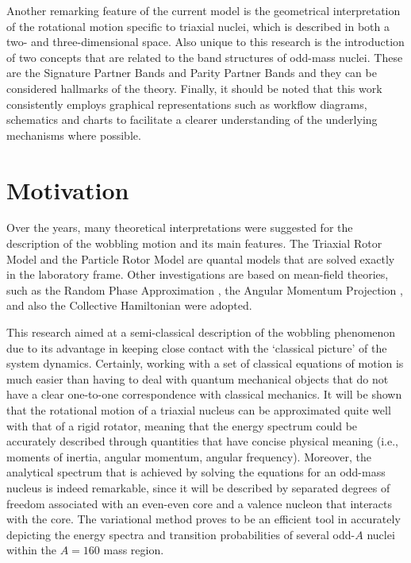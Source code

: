 Another remarking feature of the current model is the geometrical interpretation of the rotational motion specific to triaxial nuclei, which is described in both a two- and three-dimensional space. Also unique to this research is the introduction of two concepts that are related to the band structures of odd-mass nuclei. These are the Signature Partner Bands and Parity Partner Bands and they can be considered hallmarks of the theory. Finally, it should be noted that this work consistently employs graphical representations such as workflow diagrams, schematics and charts to facilitate a clearer understanding of the underlying mechanisms where possible.

\section{Motivation}

Over the years, many theoretical interpretations were suggested for the description of the wobbling motion and its main features. The Triaxial Rotor Model \cite{bohr1998nuclear,davydov1958rotational} and the Particle Rotor Model \cite{hamamoto2002wobbling} are quantal models that are solved exactly in the laboratory frame. Other investigations are based on mean-field theories, such as the Random Phase Approximation \cite{shimizu1995nuclear}, the Angular Momentum Projection \cite{oi2000wobbling}, and also the Collective Hamiltonian \cite{chen2014collective} were adopted.

This research aimed at a semi-classical description of the wobbling phenomenon due to its advantage in keeping close contact with the `classical picture' of the system dynamics. Certainly, working with a set of classical equations of motion is much easier than having to deal with quantum mechanical objects that do not have a clear one-to-one correspondence with classical mechanics. It will be shown that the rotational motion of a triaxial nucleus can be approximated quite well with that of a rigid rotator, meaning that the energy spectrum could be accurately described through quantities that have concise physical meaning (i.e., moments of inertia, angular momentum, angular frequency). Moreover, the analytical spectrum that is achieved by solving the equations for an odd-mass nucleus is indeed remarkable, since it will be described by separated degrees of freedom associated with an even-even core and a valence nucleon that interacts with the core. The variational method proves to be an efficient tool in accurately depicting the energy spectra and transition probabilities of several odd-$A$ nuclei within the $A=160$ mass region.

